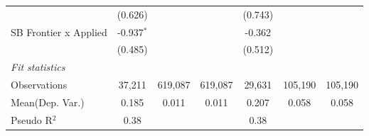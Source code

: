 \begin{tabular}{lcccccc}
                         & (0.626)       &         &         & (0.743)       &         &   \\   
   SB Frontier x Applied & -0.937$^{*}$  &         &         & -0.362        &         &   \\   
                         & (0.485)       &         &         & (0.512)       &         &   \\   
   \midrule
   \emph{Fit statistics}\\
   Observations          & 37,211        & 619,087 & 619,087 & 29,631        & 105,190 & 105,190\\  
Mean(Dep. Var.) & 0.185 & 0.011 & 0.011 & 0.207 & 0.058 & 0.058 \\
   Pseudo R$^2$          & 0.38          &         &         & 0.38          &         & \\  
   

\end{tabular}
